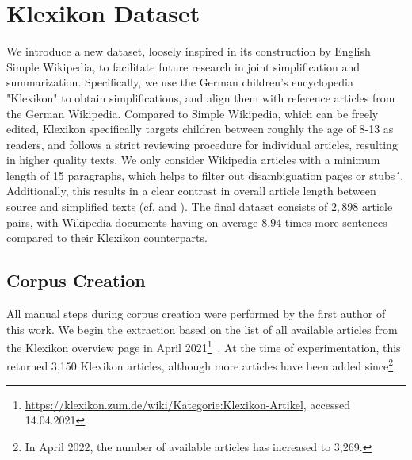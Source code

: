 \documentclass[10pt, a4paper]{article}
\begin{document}
\section{Klexikon Dataset}

We introduce a new dataset, loosely inspired in its construction by English Simple Wikipedia, to facilitate future research in joint simplification and summarization.
Specifically, we use the German children's encyclopedia "Klexikon" to obtain simplifications, and align them with reference articles from the German Wikipedia.
Compared to Simple Wikipedia, which can be freely edited, Klexikon specifically targets children between roughly the age of 8-13 as readers, and follows a strict reviewing procedure for individual articles, resulting in higher quality texts.
We only consider Wikipedia articles with a minimum length of 15 paragraphs, which helps to filter out disambiguation pages or stubs´. Additionally, this results in a clear contrast in overall article length between source and simplified texts (cf.  and ).
The final dataset consists of $2{,}898$ article pairs, with Wikipedia documents having on average $8.94$ times more sentences compared to their Klexikon counterparts.






\subsection{Corpus Creation}
All manual steps during corpus creation were performed by the first author of this work.
We begin the extraction based on the list of all available articles from the Klexikon overview page in April 2021\footnote{\url{https://klexikon.zum.de/wiki/Kategorie:Klexikon-Artikel}, accessed 14.04.2021}~. At the time of experimentation, this returned 3{,}150 Klexikon articles, although more articles have been added since\footnote{In April 2022, the number of available articles has increased to 3{,}269.}.
\end{document}
